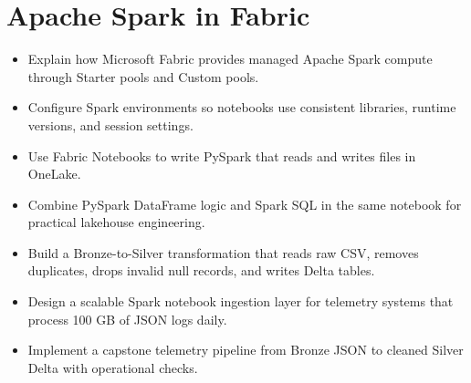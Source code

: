 \chapter{Apache Spark in Fabric}

\begin{objectives}
\begin{itemize}
    \item Explain how Microsoft Fabric provides managed Apache Spark compute through Starter pools and Custom pools.
    \item Configure Spark environments so notebooks use consistent libraries, runtime versions, and session settings.
    \item Use Fabric Notebooks to write PySpark that reads and writes files in OneLake.
    \item Combine PySpark DataFrame logic and Spark SQL in the same notebook for practical lakehouse engineering.
    \item Build a Bronze-to-Silver transformation that reads raw CSV, removes duplicates, drops invalid null records, and writes Delta tables.
    \item Design a scalable Spark notebook ingestion layer for telemetry systems that process 100 GB of JSON logs daily.
    \item Implement a capstone telemetry pipeline from Bronze JSON to cleaned Silver Delta with operational checks.
\end{itemize}
\end{objectives}

